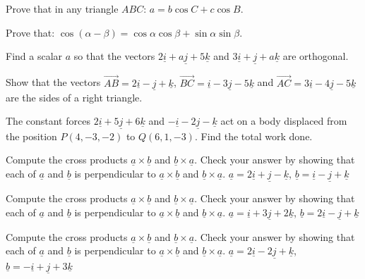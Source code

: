 \documentclass[11pt,a4paper]{article}
\begin{document}
\begin{longlist}
\item Prove that in any triangle $ABC$: $a=b\cos C + c\cos B$.

\item Prove that: $\cos(\alpha-\beta)=\cos\alpha\cos\beta + \sin\alpha\sin\beta$.

\item Find a scalar $a$ so that the vectors $2\underline{i}+a\underline{j}+5\underline{k}$ and $3\underline{i}+\underline{j}+a\underline{k}$ are orthogonal.

\item Show that the vectors $\overrightarrow{AB} =2\underline{i}-\underline{j}+\underline{k}$, $\overrightarrow{BC} = \underline{i}-3\underline{j}-5\underline{k}$ and $\overrightarrow{AC} =3\underline{i}-4\underline{j}-5\underline{k}$ are the sides of a right triangle.

\item The constant forces $2\underline{i}+5\underline{j}+6\underline{k}$ and $-\underline{i}-2\underline{j}-\underline{k}$ act on a body displaced from the position $P(4,-3,-2)$ to $Q(6,1,-3)$. Find the total work done.

\item Compute the cross products $\underline{a}\times\underline{b}$ and $\underline{b}\times\underline{a}$. Check your answer by showing that each of $\underline{a}$ and $\underline{b}$ is perpendicular to $\underline{a}\times\underline{b}$ and $\underline{b}\times\underline{a}$. $\underline{a}=2\underline{i}+\underline{j}-\underline{k}$, $\underline{b}=\underline{i}-\underline{j}+\underline{k}$

\item Compute the cross products $\underline{a}\times\underline{b}$ and $\underline{b}\times\underline{a}$. Check your answer by showing that each of $\underline{a}$ and $\underline{b}$ is perpendicular to $\underline{a}\times\underline{b}$ and $\underline{b}\times\underline{a}$. $\underline{a}=\underline{i}+3\underline{j}+2\underline{k}$, $\underline{b}=2\underline{i}-\underline{j}+\underline{k}$

\item Compute the cross products $\underline{a}\times\underline{b}$ and $\underline{b}\times\underline{a}$. Check your answer by showing that each of $\underline{a}$ and $\underline{b}$ is perpendicular to $\underline{a}\times\underline{b}$ and $\underline{b}\times\underline{a}$. $\underline{a}=2\underline{i}-2\underline{j}+\underline{k}$, $\underline{b}=-\underline{i}+\underline{j}+3\underline{k}$


\end{longlist}
\end{document}
